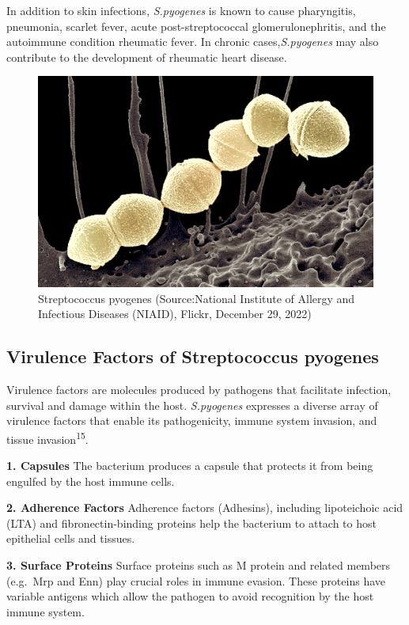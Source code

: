 \documentclass[
]{article}
\begin{document}
In addition to skin infections, \emph{S.pyogenes} is known to cause
pharyngitis, pneumonia, scarlet fever, acute post-streptococcal
glomerulonephritis, and the autoimmune condition rheumatic fever. In
chronic cases,\emph{S.pyogenes} may also contribute to the development
of rheumatic heart disease.

\begin{figure}

{\centering \includegraphics[width=0.9\linewidth]{Images/pyogenes2} 

}

\caption{Streptococcus pyogenes (Source:National Institute of Allergy and Infectious Diseases (NIAID), Flickr, December 29, 2022)}\label{fig:unnamed-chunk-11}
\end{figure}

\subsection{Virulence Factors of Streptococcus
pyogenes}\label{virulence-factors-of-streptococcus-pyogenes}

Virulence factors are molecules produced by pathogens that facilitate
infection, survival and damage within the host. \emph{S.pyogenes}
expresses a diverse array of virulence factors that enable its
pathogenicity, immune system invasion, and tissue
invasion\textsuperscript{15}.

\textbf{1. Capsules} The bacterium produces a capsule that protects it
from being engulfed by the host immune cells.

\textbf{2. Adherence Factors} Adherence factors (Adhesins), including
lipoteichoic acid (LTA) and fibronectin-binding proteins help the
bacterium to attach to host epithelial cells and tissues.

\textbf{3. Surface Proteins} Surface proteins such as M protein and
related members (e.g.~Mrp and Enn) play crucial roles in immune evasion.
These proteins have variable antigens which allow the pathogen to avoid
recognition by the host immune system.
\end{document}
